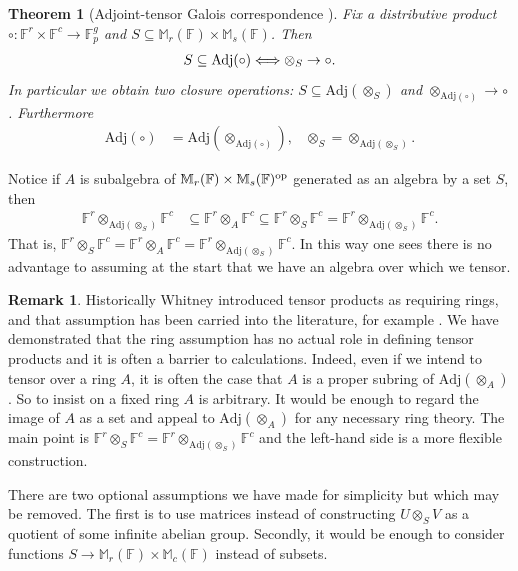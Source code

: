 \documentclass[11pt]{article}
\numberwithin{equation}{section}
\theoremstyle{definition}
\newtheorem{remark}[theorem]{Remark}
\theoremstyle{plain}
\numberwithin{equation}{section}
\theoremstyle{plain}       %
\newtheorem{thm}[equation]{Theorem}
\theoremstyle{remark}
\theoremstyle{definition}
\numberwithin{figure}{section}
\numberwithin{table}{section}
\renewcommand{\subset}{\subseteq}
\newcommand{\bbF}{\mathbb{F}}  %
\begin{document}
\begin{thm}[Adjoint-tensor Galois correspondence
{\cite[Theorem~2.11]{BW:autotopism}}] 
\label{thm:Galois}
	Fix a distributive product $\circ:\bbF^r\times\bbF^c\to \bbF_p^g$ and
	$S\subseteq \mathbb{M}_r(\bbF)\times \mathbb{M}_s(\bbF)$.  Then
	\begin{align*}
		 S\subseteq {\rm Adj}(\circ) \Longleftrightarrow 
		 \otimes_S \to \circ.
	\end{align*}
	In particular we obtain two closure operations: $S\subset
	\mathrm{Adj}(\otimes_S)$ and $\otimes_{\mathrm{Adj}(\circ)}\to \circ$.
	Furthermore
	\begin{align*}
		\mathrm{Adj}(\circ) & =\mathrm{Adj}(\otimes_{\mathrm{Adj}(\circ)}), &
		\otimes_S = \otimes_{\mathrm{Adj}(\otimes_S)}.
	\end{align*}
\end{thm}

Notice if $A$ is subalgebra of $\mathbb{M}_r(\bbF)\times \mathbb{M}_s(\bbF)^{\rm
op}$ generated as an algebra by a set $S$, then 
\begin{align*}
	\bbF^r\otimes_{\mathrm{Adj}(\otimes_S)}\bbF^c & 
	\subseteq \bbF^r\otimes_A\bbF^c  \subseteq 
	\bbF^r\otimes_S\bbF^c 
	= \bbF^r\otimes_{\mathrm{Adj}(\otimes_S)}\bbF^c.
\end{align*}
That is, $\bbF^r\otimes_S\bbF^c=\bbF^r\otimes_A\bbF^c
=\bbF^r\otimes_{\mathrm{Adj}(\otimes_S)}\bbF^c$.
In this way one sees there is no advantage to assuming at the start that we have
an algebra over which we tensor.

\begin{remark}\label{rem:no-ring}
  Historically Whitney introduced tensor products as requiring rings, and that
 assumption has been carried into the literature, for example
 \cite[Section~IV.5]{Hungerford}. We have demonstrated that the ring assumption
 has no actual role in defining tensor products and it is often a barrier to
 calculations.  Indeed, even if we intend to tensor over a ring $A$, it is
 often
 the case that $A$ is a proper subring of $\mathrm{Adj}(\otimes_A)$.  So to
 insist on a fixed ring $A$ is arbitrary. It would be enough to regard the
 image
 of $A$ as a set and appeal to $\mathrm{Adj}(\otimes_A)$ for any necessary
 ring  theory.  The main point is $\bbF^r\otimes_S\bbF^c =
 \bbF^r\otimes_{\mathrm{Adj}(\otimes_S)}\bbF^c$ and the left-hand side
 is a more flexible construction.

There are two optional assumptions we have made for simplicity but which may
be removed. The first is to use matrices instead of constructing 
$U\otimes_S V$ as a quotient of some infinite abelian group.  
Secondly, it would be
enough to consider functions 
$S\to \mathbb{M}_r(\bbF)\times \mathbb{M}_c(\bbF)$ instead of subsets.
\end{remark}
\end{document}
